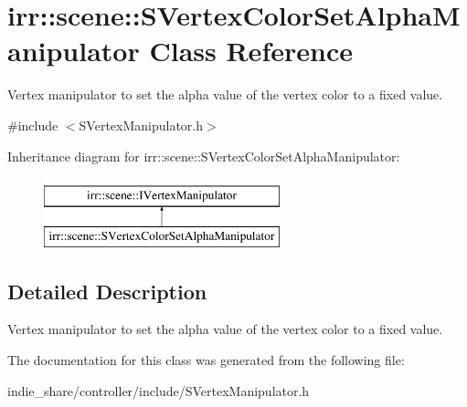 \hypertarget{classirr_1_1scene_1_1SVertexColorSetAlphaManipulator}{}\section{irr\+:\+:scene\+:\+:S\+Vertex\+Color\+Set\+Alpha\+Manipulator Class Reference}
\label{classirr_1_1scene_1_1SVertexColorSetAlphaManipulator}


Vertex manipulator to set the alpha value of the vertex color to a fixed value.  




{\ttfamily \#include $<$S\+Vertex\+Manipulator.\+h$>$}

Inheritance diagram for irr\+:\+:scene\+:\+:S\+Vertex\+Color\+Set\+Alpha\+Manipulator\+:\begin{figure}[H]
\begin{center}
\leavevmode
\includegraphics[height=2.000000cm]{classirr_1_1scene_1_1SVertexColorSetAlphaManipulator}
\end{center}
\end{figure}


\subsection{Detailed Description}
Vertex manipulator to set the alpha value of the vertex color to a fixed value. 

The documentation for this class was generated from the following file\+:\begin{DoxyCompactItemize}
\item 
indie\+\_\+share/controller/include/S\+Vertex\+Manipulator.\+h\end{DoxyCompactItemize}
